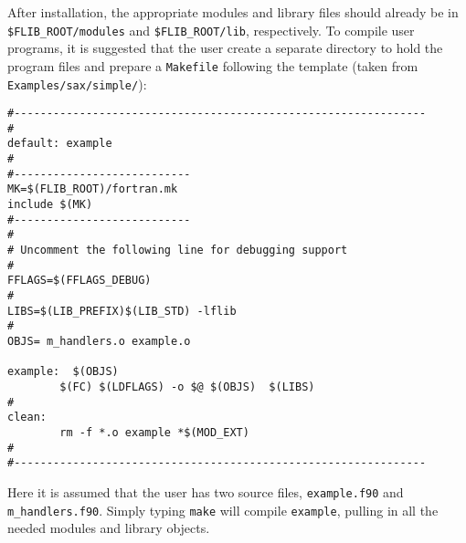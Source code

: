 \documentclass[11pt]{article}
\begin{document}
After installation, the appropriate modules and library files should
already be in \texttt{\$FLIB\_ROOT/modules} and
\texttt{\$FLIB\_ROOT/lib}, respectively. To compile user programs, it
is suggested that the user create a separate directory to hold the
program files and prepare a \texttt{Makefile} following the template
(taken from \texttt{Examples/sax/simple/}):

\begin{verbatim}
#---------------------------------------------------------------
#
default: example
#
#---------------------------
MK=$(FLIB_ROOT)/fortran.mk
include $(MK)
#---------------------------
#
# Uncomment the following line for debugging support
#
FFLAGS=$(FFLAGS_DEBUG)
#
LIBS=$(LIB_PREFIX)$(LIB_STD) -lflib
#
OBJS= m_handlers.o example.o
     
example:  $(OBJS)
        $(FC) $(LDFLAGS) -o $@ $(OBJS)  $(LIBS)
#
clean: 
        rm -f *.o example *$(MOD_EXT)
#
#---------------------------------------------------------------
\end{verbatim}
%
Here it is assumed that the user has two source files,
\texttt{example.f90} and \texttt{m\_handlers.f90}. Simply typing
\texttt{make} will compile \texttt{example}, pulling in all the needed
modules and library objects.
\end{document}
